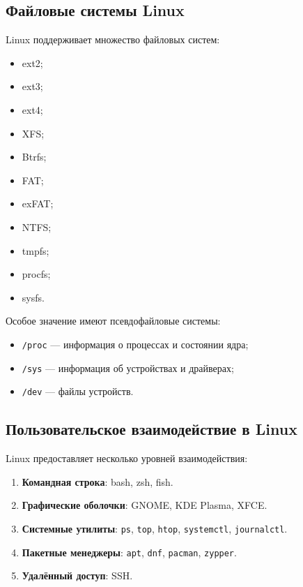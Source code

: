 \documentclass[12pt,a4paper]{article}
\begin{document}
\subsection{Файловые системы Linux}

Linux поддерживает множество файловых систем:

\begin{itemize}
    \item ext2;
    \item ext3;
    \item ext4;
    \item XFS;
    \item Btrfs;
    \item FAT;
    \item exFAT;
    \item NTFS;
    \item tmpfs;
    \item procfs;
    \item sysfs.
\end{itemize}

Особое значение имеют псевдофайловые системы:

\begin{itemize}
    \item \texttt{/proc} --- информация о процессах и состоянии ядра;
    \item \texttt{/sys} --- информация об устройствах и драйверах;
    \item \texttt{/dev} --- файлы устройств.
\end{itemize}

\subsection{Пользовательское взаимодействие в Linux}

Linux предоставляет несколько уровней взаимодействия:

\begin{enumerate}
    \item \textbf{Командная строка}: bash, zsh, fish.
    \item \textbf{Графические оболочки}: GNOME, KDE Plasma, XFCE.
    \item \textbf{Системные утилиты}: \texttt{ps}, \texttt{top}, \texttt{htop}, \texttt{systemctl}, \texttt{journalctl}.
    \item \textbf{Пакетные менеджеры}: \texttt{apt}, \texttt{dnf}, \texttt{pacman}, \texttt{zypper}.
    \item \textbf{Удалённый доступ}: SSH.
\end{enumerate}
\end{document}
